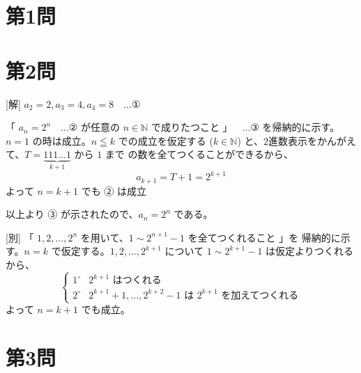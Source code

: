 \documentclass[../main.tex]{subfiles}
\begin{document}
\section*{第1問}


\section*{第2問}

[解] $a_2 = 2, a_3 = 4, a_4 = 8 \quad \dots \text{①}$

「 $a_n = 2^n \quad \dots \text{②}$ が任意の $n \in \mathbb{N}$ で成りたつこと 」$\quad \dots \text{③}$
を帰納的に示す。$n=1$ の時は成立。$n \leqq k$ での成立を仮定する
($k \in \mathbb{N}$) と、$2$進数表示をかんがえて、$T = \underbrace{111\dots1}_{k+1}$ から $1$ まで
の数を全てつくることができるから、
\[
  a_{k+1} = T + 1 = 2^{k+1}
\]
よって $n = k+1$ でも ② は成立

以上より ③ が示されたので、$a_n = 2^n$ である。

[別] 「 $1, 2, \dots, 2^n$ を用いて、$1 \sim 2^{n+1}-1$ を全てつくれること 」を
帰納的に示す。$n=k$ で仮定する。$1, 2, \dots, 2^{k+1}$ について
$1 \sim 2^{k+1}-1$ は仮定よりつくれるから、
\[
  \begin{cases}
    1^\circ & 2^{k+1} \text{ はつくれる} \\
    2^\circ & 2^{k+1}+1, \dots, 2^{k+2}-1 \text{ は } 2^{k+1} \text{ を加えてつくれる}
  \end{cases}
\]
よって $n = k+1$ でも成立。

\section*{第3問}

\begin{center}
\end{center}
\end{document}
